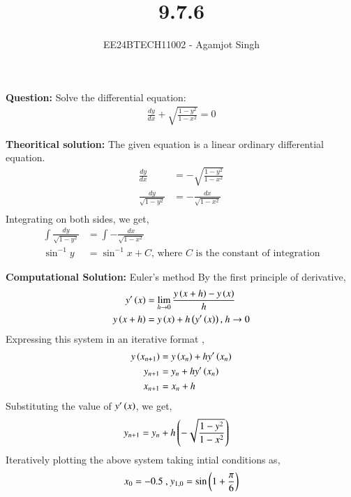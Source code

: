 \documentclass[journal]{IEEEtran}
\begin{document}

\vspace{3cm}

\title{9.7.6}
\author{EE24BTECH11002 - Agamjot Singh}
{\let\newpage\relax\maketitle}

\renewcommand{\thefigure}{\theenumi}
\renewcommand{\thetable}{\theenumi}
\setlength{\intextsep}{10pt} %

\textbf{Question:}
\newline
Solve the differential equation:
\begin{align}
    \frac{dy}{dx} + \sqrt{\frac{1 - y^2}{1 - x^2}} = 0
\end{align}

\textbf{Theoritical solution:}
The given equation is a linear ordinary differential equation.
\begin{align}
    \frac{dy}{dx} &= -\sqrt{\frac{1 - y^2}{1 - x^2}}\\
    \frac{dy}{\sqrt{1 - y^2}} &= -\frac{dx}{\sqrt{1 - x^2}}\\
\end{align}
Integrating on both sides, we get,
\begin{align}
    \int \frac{dy}{\sqrt{1 - y^2}} &= \int -\frac{dx}{\sqrt{1 - x^2}}\\
    \sin^{-1}{y} &= \sin^{-1}{x} + C \text{, where } C \text{ is the constant of integration}
\end{align}

\textbf{Computational Solution:} Euler's method
\newline
By the first principle of derivative,
\begin{align}
    y^{\prime}\left(x\right) &= \lim_{h\to0} \frac{y\left(x + h\right) - y\left(x\right)}{h}\\
    y\left(x + h\right) &= y\left(x\right) + h\left(y^{\prime}\left(x\right)\right) \text{, } h\to0
\end{align}
Expressing this system in an iterative format ,
\begin{align}
    y\left(x_{n + 1}\right) &= y\left(x_n\right) + hy^{\prime}\left(x_n\right)\\
    y_{n + 1} &= y_n + hy^{\prime}\left(x_n\right)\\
    x_{n + 1} &= x_n + h
\end{align}
Substituting the value of $y^{\prime}\left(x\right)$, we get,
\begin{align}
    y_{n + 1} &= y_n + h\left(-\sqrt{\frac{1 - y^2}{1 - x^2}}\right)
\end{align}
Iteratively plotting the above system taking intial conditions as,
\begin{align}
    x_0 = -0.5 \text{ , } y_{1, 0} = \sin{\ensuremath{\left(1 + \frac{\pi}{6}\right)}}
\end{align}
\end{document}
